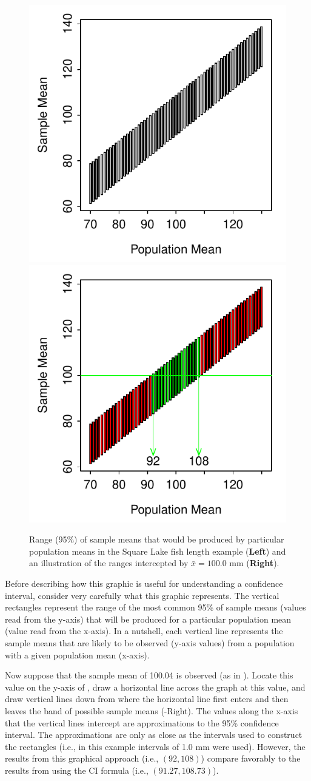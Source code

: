 \documentclass[10pt,openany]{book}\usepackage[]{graphicx}\usepackage[]{color}
\newenvironment{knitrout}{}{} %
\begin{document}
\begin{knitrout}
\color{fgcolor}\begin{figure}[hbtp]

{\centering \includegraphics[width=.4\linewidth]{Figs/CIAlt1-1} 
\includegraphics[width=.4\linewidth]{Figs/CIAlt1-2} 

}

\caption{Range (95\%) of sample means that would be produced by particular population means in the Square Lake fish length example (\textbf{Left}) and an illustration of the ranges intercepted by $\bar{x}=100.0$ mm (\textbf{Right}).}\label{fig:CIAlt1}
\end{figure}


\end{knitrout}

Before describing how this graphic is useful for understanding a confidence interval, consider very carefully what this graphic represents.  The vertical rectangles represent the range of the most common 95\% of sample means (values read from the y-axis) that will be produced for a particular population mean (value read from the x-axis).  In a nutshell, each vertical line represents the sample means that are likely to be observed (y-axis values) from a population with a given population mean (x-axis).

Now suppose that the sample mean of 100.04 is observed (as in ).  Locate this value on the y-axis of , draw a horizontal line across the graph at this value, and draw vertical lines down from where the horizontal line first enters and then leaves the band of possible sample means (-Right).  The values along the x-axis that the vertical lines intercept are approximations to the 95\% confidence interval.  The approximations are only as close as the intervals used to construct the rectangles (i.e., in this example intervals of 1.0 mm were used).  However, the results from this graphical approach (i.e., $(92,108)$) compare favorably to the results from using the CI formula (i.e., $(91.27,108.73)$).
\end{document}
